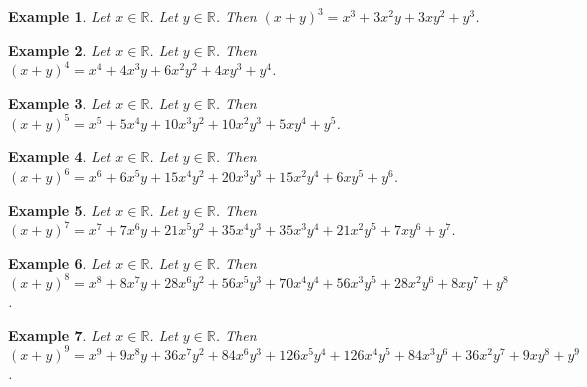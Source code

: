 \documentclass{article}
\newtheorem{example}{Example}
\begin{document}
\begin{example}
Let $x\in\mathbb{R}$. Let $y\in\mathbb{R}$. Then ${(x+y)}^3=x^3+3x^2y+3xy^2+y^3$.
\end{example}

\begin{example}
Let $x\in\mathbb{R}$. Let $y\in\mathbb{R}$. Then ${(x+y)}^4=x^4+4x^3y+6x^2y^2+4xy^3+y^4$.
\end{example}

\begin{example}
Let $x\in\mathbb{R}$. Let $y\in\mathbb{R}$. Then ${(x+y)}^5=x^5+5x^4y+10x^3y^2+10x^2y^3+5xy^4+y^5$.
\end{example}

\begin{example}
Let $x\in\mathbb{R}$. Let $y\in\mathbb{R}$. Then ${(x+y)}^6=x^6+6x^5y+15x^4y^2+20x^3y^3+15x^2y^4+6xy^5+y^6$.
\end{example}

\begin{example}
Let $x\in\mathbb{R}$. Let $y\in\mathbb{R}$. Then ${(x+y)}^7=x^7+7x^6y+21x^5y^2+35x^4y^3+35x^3y^4+21x^2y^5+7xy^6+y^7$.
\end{example}

\begin{example}
Let $x\in\mathbb{R}$. Let $y\in\mathbb{R}$. Then ${(x+y)}^8=x^8+8x^7y+28x^6y^2+56x^5y^3+70x^4y^4+56x^3y^5+28x^2y^6+8xy^7+y^8$.
\end{example}

\begin{example}
Let $x\in\mathbb{R}$. Let $y\in\mathbb{R}$. Then ${(x+y)}^9=x^9+9x^8y+36x^7y^2+84x^6y^3+126x^5y^4+126x^4y^5+84x^3y^6+36x^2y^7+9xy^8+y^9$.
\end{example}
\end{document}

